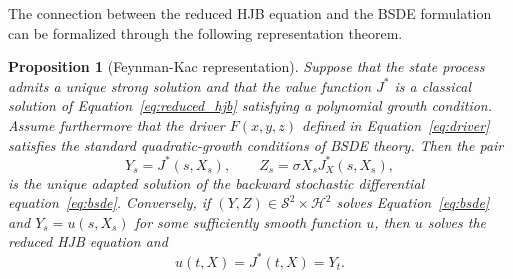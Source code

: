 \documentclass[11pt]{article}
\newtheorem{prop}[theorem]{\bf Proposition}
\begin{document}
	The connection between the reduced HJB equation and the BSDE formulation can be formalized through the following representation theorem.
	
	\begin{prop}[Feynman-Kac representation]
		Suppose that the state process admits a unique strong solution and that the value function $J^*$ is a classical solution of Equation~\eqref{eq:reduced_hjb} satisfying a polynomial growth condition. Assume furthermore that the driver $F(x,y,z)$ defined in Equation~\eqref{eq:driver} satisfies the standard quadratic-growth conditions of BSDE theory. Then the pair
		\[
		Y_s=J^*(s,X_s),
		\qquad
		Z_s=\sigma X_sJ_X^*(s,X_s),
		\]
		is the unique adapted solution of the backward stochastic differential equation~\eqref{eq:bsde}. Conversely, if $(Y,Z)\in\mathcal{S}^2\times\mathcal{H}^2$ solves Equation~\eqref{eq:bsde} and $Y_s=u(s,X_s)$ for some sufficiently smooth function $u$, then $u$ solves the reduced HJB equation and
		\[
		u(t,X)=J^*(t,X)=Y_t.
		\]
	\end{prop}
	
\end{document}
